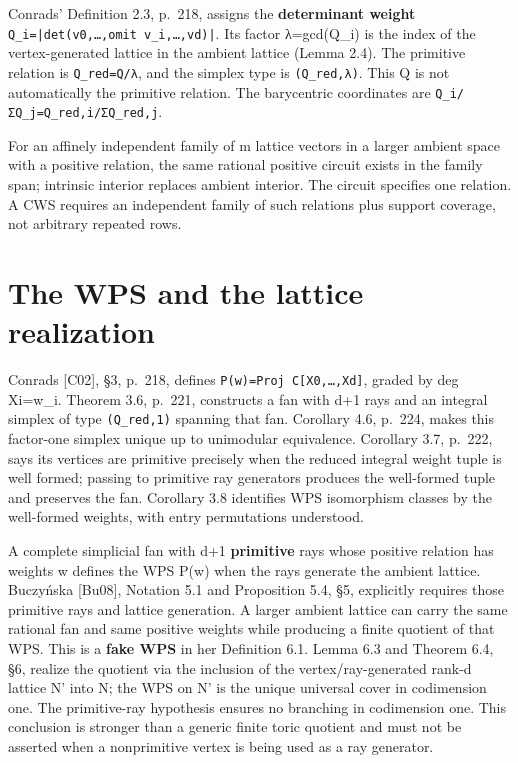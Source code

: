 \documentclass[11pt,a4paper,oneside]{report}
\begin{document}
Conrads' Definition 2.3, p.~218, assigns the \textbf{determinant weight}
\texttt{Q\_\allowbreak{}i=\allowbreak{}|det(\allowbreak{}v0,\allowbreak{}…,\allowbreak{}omit v\_\allowbreak{}i,\allowbreak{}…,\allowbreak{}vd)\allowbreak{}|}.
Its factor λ=gcd(Q\_i) is the index of the vertex-generated lattice in
the ambient lattice (Lemma 2.4). The primitive relation is
\texttt{Q\_\allowbreak{}red=\allowbreak{}Q/\allowbreak{}λ}, and the
simplex type is
\texttt{(\allowbreak{}Q\_\allowbreak{}red,\allowbreak{}λ)}. This Q is
not automatically the primitive relation. The barycentric coordinates
are
\texttt{Q\_\allowbreak{}i/\allowbreak{}ΣQ\_\allowbreak{}j=\allowbreak{}Q\_\allowbreak{}red,\allowbreak{}i/\allowbreak{}ΣQ\_\allowbreak{}red,\allowbreak{}j}.

For an affinely independent family of m lattice vectors in a larger
ambient space with a positive relation, the same rational positive
circuit exists in the family span; intrinsic interior replaces ambient
interior. The circuit specifies one relation. A CWS requires an
independent family of such relations plus support coverage, not
arbitrary repeated rows.

\section{The WPS and the lattice
realization}\label{weight-systems-and-wps--the-wps-and-the-lattice-realization}

Conrads {[}C02{]}, §3, p.~218, defines
\texttt{P(\allowbreak{}w)\allowbreak{}=\allowbreak{}Proj C[\allowbreak{}X0,\allowbreak{}…,\allowbreak{}Xd]},
graded by deg Xi=w\_i. Theorem 3.6, p.~221, constructs a fan with d+1
rays and an integral simplex of type
\texttt{(\allowbreak{}Q\_\allowbreak{}red,\allowbreak{}1)} spanning that
fan. Corollary 4.6, p.~224, makes this factor-one simplex unique up to
unimodular equivalence. Corollary 3.7, p.~222, says its vertices are
primitive precisely when the reduced integral weight tuple is well
formed; passing to primitive ray generators produces the well-formed
tuple and preserves the fan. Corollary 3.8 identifies WPS isomorphism
classes by the well-formed weights, with entry permutations understood.

A complete simplicial fan with d+1 \textbf{primitive} rays whose
positive relation has weights w defines the WPS P(w) when the rays
generate the ambient lattice. Buczyńska {[}Bu08{]}, Notation 5.1 and
Proposition 5.4, §5, explicitly requires those primitive rays and
lattice generation. A larger ambient lattice can carry the same rational
fan and same positive weights while producing a finite quotient of that
WPS. This is a \textbf{fake WPS} in her Definition 6.1. Lemma 6.3 and
Theorem 6.4, §6, realize the quotient via the inclusion of the
vertex/ray-generated rank-d lattice N' into N; the WPS on N' is the
unique universal cover in codimension one. The primitive-ray hypothesis
ensures no branching in codimension one. This conclusion is stronger
than a generic finite toric quotient and must not be asserted when a
nonprimitive vertex is being used as a ray generator.
\end{document}
